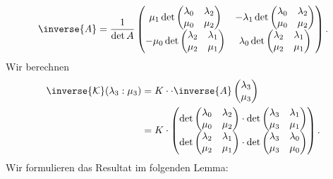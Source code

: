 \begin{equation*}
  \inverse{A}=\frac{1}{\det A}\begin{pmatrix}
    \mu_1 \det \begin{pmatrix} \lambda_0 & \lambda_2 \\ \mu_0 & \mu_2 \end{pmatrix} & -\lambda_1 \det \begin{pmatrix} \lambda_0 & \lambda_2 \\ \mu_0 & \mu_2 \end{pmatrix} \\
    -\mu_0 \det \begin{pmatrix} \lambda_2 & \lambda_1 \\ \mu_2 & \mu_1 \end{pmatrix} & \lambda_0 \det \begin{pmatrix} \lambda_2 & \lambda_1 \\ \mu_2 & \mu_1 \end{pmatrix}
  \end{pmatrix}.
\end{equation*}
Wir berechnen
\begin{align*}
  \inverse{\mathcal{K}}(\lambda_3:\mu_3)&=K\cdot\cdot\inverse{A}\begin{pmatrix} \lambda_3 \\ \mu_3 \end{pmatrix}\\
  &=K\cdot \begin{pmatrix}\det \begin{pmatrix} \lambda_0 & \lambda_2 \\ \mu_0 & \mu_2 \end{pmatrix}\cdot \det \begin{pmatrix} \lambda_3 & \lambda_1 \\ \mu_3 & \mu_1 \end{pmatrix} \\ \det \begin{pmatrix} \lambda_2 & \lambda_1 \\ \mu_2 & \mu_1 \end{pmatrix}\cdot\det \begin{pmatrix} \lambda_3 & \lambda_0 \\ \mu_3 & \mu_0 \end{pmatrix} \end{pmatrix}.
\end{align*}
Wir formulieren das Resultat im folgenden Lemma:

